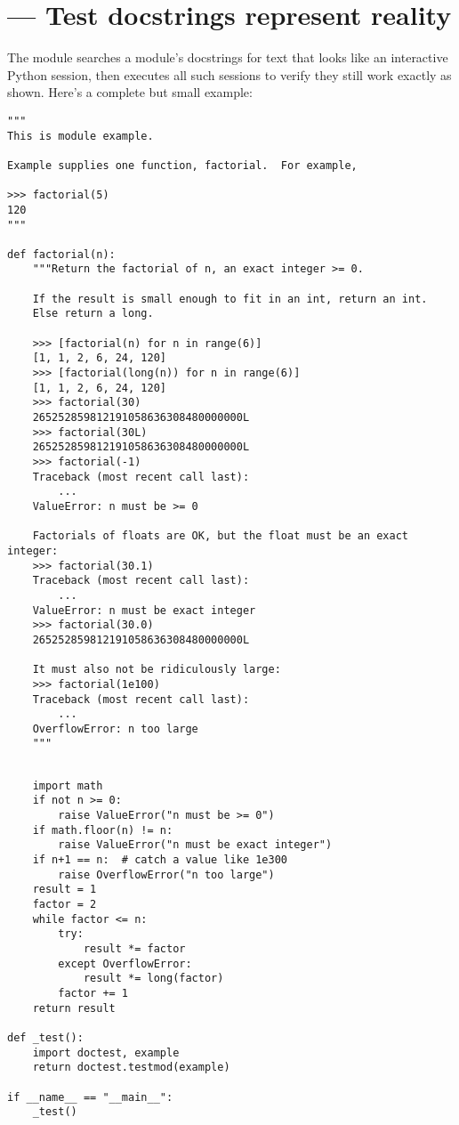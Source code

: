 \section{ ---
         Test docstrings represent reality}



The  module searches a module's docstrings for text that looks
like an interactive Python session, then executes all such sessions to verify
they still work exactly as shown.  Here's a complete but small example:

\begin{verbatim}
"""
This is module example.

Example supplies one function, factorial.  For example,

>>> factorial(5)
120
"""

def factorial(n):
    """Return the factorial of n, an exact integer >= 0.

    If the result is small enough to fit in an int, return an int.
    Else return a long.

    >>> [factorial(n) for n in range(6)]
    [1, 1, 2, 6, 24, 120]
    >>> [factorial(long(n)) for n in range(6)]
    [1, 1, 2, 6, 24, 120]
    >>> factorial(30)
    265252859812191058636308480000000L
    >>> factorial(30L)
    265252859812191058636308480000000L
    >>> factorial(-1)
    Traceback (most recent call last):
        ...
    ValueError: n must be >= 0

    Factorials of floats are OK, but the float must be an exact integer:
    >>> factorial(30.1)
    Traceback (most recent call last):
        ...
    ValueError: n must be exact integer
    >>> factorial(30.0)
    265252859812191058636308480000000L

    It must also not be ridiculously large:
    >>> factorial(1e100)
    Traceback (most recent call last):
        ...
    OverflowError: n too large
    """

\end{verbatim}
\begin{verbatim}

    import math
    if not n >= 0:
        raise ValueError("n must be >= 0")
    if math.floor(n) != n:
        raise ValueError("n must be exact integer")
    if n+1 == n:  # catch a value like 1e300
        raise OverflowError("n too large")
    result = 1
    factor = 2
    while factor <= n:
        try:
            result *= factor
        except OverflowError:
            result *= long(factor)
        factor += 1
    return result

def _test():
    import doctest, example
    return doctest.testmod(example)

if __name__ == "__main__":
    _test()
\end{verbatim}

